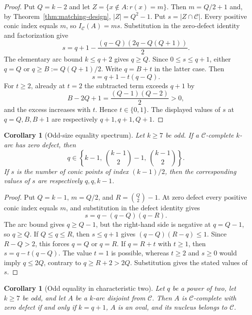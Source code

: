 \documentclass[11pt]{article}
\newtheorem{corollary}[theorem]{Corollary}
\theoremstyle{definition}
\theoremstyle{remark}
\newcommand{\cC}{\mathcal{C}}
\newcommand{\IC}{I_{\cC}}
\begin{document}
\begin{proof}
Put $Q=k-2$ and let $Z=\{x\notin A:r(x)=m\}$.  Then
$m=Q/2+1$ and, by Theorem~\ref{thm:matching-design}, $|Z|=Q^2-1$.
Put $s=|Z\cap\cC|$.  Every positive conic index equals $m$, so
$\IC(A)=ms$.  Substitution in the zero-defect identity and factorization
give
\[
 s=q+1-\frac{(q-Q)(2q-Q(Q+1))}{2}.
\]
The elementary arc bound $k\le q+2$ gives $q\ge Q$.  Since
$0\le s\le q+1$, either $q=Q$ or
$q\ge B:=Q(Q+1)/2$.  Write $q=B+t$ in the latter case.  Then
\[
 s=q+1-t(q-Q).
\]
For $t\ge2$, already at $t=2$ the subtracted term exceeds $q+1$ by
\[
 B-2Q+1=\frac{(Q-1)(Q-2)}2>0,
\]
and the excess increases with $t$.  Hence $t\in\{0,1\}$.  The displayed
values of $s$ at $q=Q,B,B+1$ are respectively $q+1,q+1,Q+1$.
\end{proof}

\begin{corollary}[Odd-size equality spectrum]
\label{cor:odd-equality-spectrum}
Let $k\ge7$ be odd.  If a $\cC$-complete $k$-arc has zero defect, then
\[
 q\in
 \left\{
   k-1,\ \binom{k-1}{2}-1,\ \binom{k-1}{2}
 \right\}.
\]
If $s$ is the number of conic points of index $(k-1)/2$, then the
corresponding values of $s$ are respectively $q,q,k-1$.
\end{corollary}

\begin{proof}
Put $Q=k-1$, $m=Q/2$, and
$R=\binom Q2-1$.  At zero defect every positive conic index equals $m$,
and substitution in the defect identity gives
\[
 s=q-(q-Q)(q-R).
\]
The arc bound gives $q\ge Q-1$, but the right-hand side is negative at
$q=Q-1$, so $q\ge Q$.  If $Q\le q\le R$, then $s\le q+1$ gives
$(q-Q)(R-q)\le1$.  Since $R-Q>2$, this forces $q=Q$ or $q=R$.
If $q=R+t$ with $t\ge1$, then $s=q-t(q-Q)$.  The value $t=1$ is
possible, whereas $t\ge2$ and $s\ge0$ would imply $q\le2Q$, contrary to
$q\ge R+2>2Q$.  Substitution gives the stated values of $s$.
\end{proof}

\begin{corollary}[Odd equality in characteristic two]
\label{cor:odd-characteristic-two-equality}
Let $q$ be a power of two, let $k\ge7$ be odd, and let $A$ be a $k$-arc
disjoint from $\cC$.  Then $A$ is $\cC$-complete with zero defect if and
only if $k=q+1$, $A$ is an oval, and its nucleus belongs to $\cC$.
\end{corollary}
\end{document}
